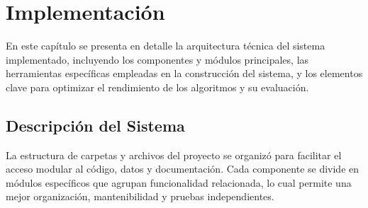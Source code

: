 
\chapter{Implementación}\label{ch:implementacion}
En este capítulo se presenta en detalle la arquitectura técnica del sistema implementado, incluyendo los componentes y
módulos principales, las herramientas específicas empleadas en la construcción del sistema, y los elementos clave para
optimizar el rendimiento de los algoritmos y su evaluación.


\section{Descripción del Sistema}\label{sec:descripcion-del-sistema}
La estructura de carpetas y archivos del proyecto se organizó para facilitar el acceso modular al código, datos y
documentación.
Cada componente se divide en módulos específicos que agrupan funcionalidad relacionada, lo cual permite una mejor
organización, mantenibilidad y pruebas independientes.

